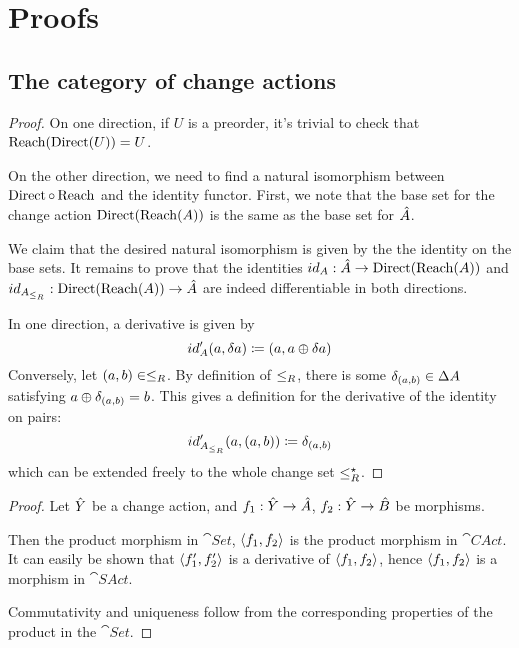 \appendix
\appendixpage
\section{Proofs}

\subsection{The category of change actions}

\preordEquivalence*
\begin{proof}
  \label{prf:preordEquivalence}
  On one direction, if $U$ is a preorder, it's trivial to check that $\operatorname{Reach} (\operatorname{Direct} (U)) = U$.

  On the other direction, we need to find a natural isomorphism between $\operatorname{Direct} \circ \operatorname{Reach}$
  and the identity functor. First, we note that the base set for the change action
  $\operatorname{Direct}(\operatorname{Reach}(A))$ is the same as the base set for $\hat{A}$.

  We claim that the desired natural isomorphism is given by the
  the identity on the base sets. It remains to prove that the identities
  $id_A : \hat{A} \rightarrow \operatorname{Direct}(\operatorname{Reach}(A))$ and
  $id_{A_{\leq_R}} : \operatorname{Direct}(\operatorname{Reach}(A)) \rightarrow \hat{A}$
  are indeed differentiable in both directions.

  In one direction, a derivative is given by
  \begin{displaymath}
    id'_A(a, \delta a) \coloneqq (a, a \oplus \delta a)
  \end{displaymath}
  Conversely, let $(a, b) \in \leq_R$. By definition of $\leq_R$, there is some
  $\delta_{(a, b)} \in \Delta A$ satisfying $a \oplus \delta_{(a,b)} = b$.
  This gives a definition for the derivative of the identity on pairs:
  \begin{displaymath}
    id'_{A_{\leq_R}}(a, (a, b)) \coloneqq \delta_{(a, b)}
  \end{displaymath}
  which can be extended freely to the whole change set $\leq_R^\star$. 
\end{proof}

\products*
\begin{proof}
  \label{prf:products}
  Let $\hat{Y}$ be a change action, and $f_1: \hat{Y} \rightarrow \hat{A}$, $f_2: \hat{Y}
  \rightarrow \hat{B}$ be morphisms.

  Then the product morphism in $\cat{Set}$, $\left\langle {f_1}, {f_2} \right\rangle$ is the product
  morphism in $\cat{CAct}$. It can easily be
  shown that $\left\langle {f_1'}, {f_2'} \right\rangle$ is a derivative of $\left\langle {f_1}, {f_2} \right\rangle$,
  hence $\left\langle {f_1}, {f_2} \right\rangle$ is a morphism in $\cat{SAct}$.

  Commutativity and uniqueness follow from the corresponding properties of the
  product in the $\cat{Set}$.
\end{proof}


